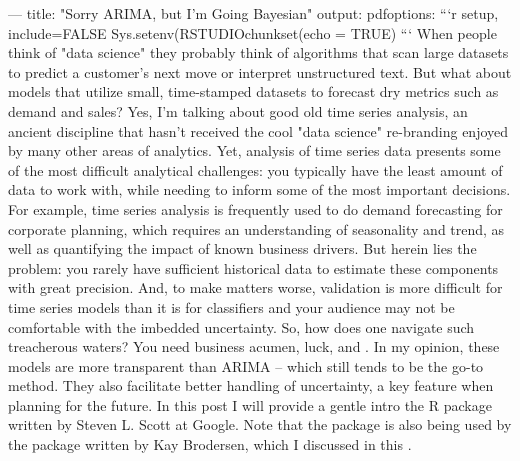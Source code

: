 --- title: "Sorry ARIMA, but I'm Going Bayesian" output: pdfoptions: \markdownRendererInterblockSeparator
{}\markdownRendererInterblockSeparator
{}```\markdownRendererLeftBrace{}r setup, include=FALSE\markdownRendererRightBrace{} Sys.setenv(RSTUDIOchunk\markdownRendererDollarSign{}set(echo = TRUE)\markdownRendererInterblockSeparator
{}```\markdownRendererInterblockSeparator
{}When people think of "data science" they probably think of algorithms that scan large datasets to predict a customer's next move or interpret unstructured text. But what about models that utilize small, time-stamped datasets to forecast dry metrics such as demand and sales? Yes, I'm talking about good old time series analysis, an ancient discipline that hasn't received the cool "data science" re-branding enjoyed by many other areas of analytics.\markdownRendererInterblockSeparator
{}Yet, analysis of time series data presents some of the most difficult analytical challenges: you typically have the least amount of data to work with, while needing to inform some of the most important decisions. For example, time series analysis is frequently used to do demand forecasting for corporate planning, which requires an understanding of seasonality and trend, as well as quantifying the impact of known business drivers. But herein lies the problem: you rarely have sufficient historical data to estimate these components with great precision. And, to make matters worse, validation is more difficult for time series models than it is for classifiers and your audience may not be comfortable with the imbedded uncertainty.\markdownRendererInterblockSeparator
{}So, how does one navigate such treacherous waters? You need business acumen, luck, and . In my opinion, these models are more transparent than ARIMA – which still tends to be the go-to method. They also facilitate better handling of uncertainty, a key feature when planning for the future. In this post I will provide a gentle intro the  R package written by Steven L. Scott at Google. Note that the  package is also being used by the  package written by Kay Brodersen, which I discussed in this .\markdownRendererInterblockSeparator
